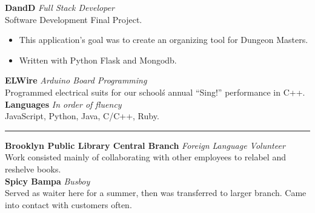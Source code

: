 \documentclass[14, .75in]{article}
\begin{document}
  \textbf{DandD}\textit{ Full Stack Developer}\\
  Software Development Final Project.
  \begin{itemize}[label={--},noitemsep, topsep=0pt]
    \item This application's goal was to create an organizing tool for Dungeon Masters.
    \item Written with Python Flask and Mongodb.
  \end{itemize}
  \textbf{ELWire}\textit{ Arduino Board Programming}\\
  Programmed electrical suits for our school\'s annual ``Sing!'' performance in C++.\\
  \textbf{Languages}\textit{ In order of fluency}\\
  JavaScript, Python, Java, C/C++, Ruby.\\
  \vspace{0.1cm} \hrule \vspace{0.3cm}
  \noindent\textbf{Brooklyn Public Library Central Branch}\textit{ Foreign Language Volunteer}\\
  Work consisted mainly of collaborating with other employees to relabel and reshelve books.\\
  \textbf{Spicy Bampa}\textit{ Busboy}\\
  Served as waiter here for a summer, then was transferred to larger branch. Came into contact with customers often.


\end{document}
